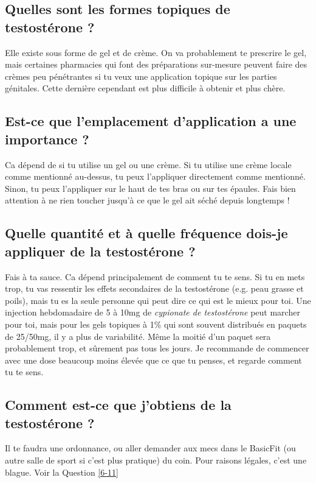 \documentclass{article}
\begin{document}
\subsection{Quelles sont les formes topiques de testostérone ?}

Elle existe sous forme de gel et de crème. On va probablement te prescrire le gel, mais certaines pharmacies qui font des préparations sur-mesure peuvent faire des crèmes peu pénétrantes si tu veux une application topique sur les parties génitales. Cette dernière cependant est plus difficile à obtenir et plus chère.

\subsection{Est-ce que l'emplacement d'application a une importance ?}

Ca dépend de si tu utilise un gel ou une crème. Si tu utilise une crème locale comme mentionné au-dessus, tu peux l'appliquer directement comme mentionné. Sinon, tu peux l'appliquer sur le haut de tes bras ou sur tes épaules. Fais bien attention à ne rien toucher jusqu'à ce que le gel ait séché depuis longtemps !

\subsection{Quelle quantité et à quelle fréquence dois-je appliquer de la testostérone ?}

Fais à ta sauce. Ca dépend principalement de comment tu te sens. Si tu en mets trop, tu vas ressentir les effets secondaires de la testostérone (e.g. peau grasse et poils), mais tu es la seule personne qui peut dire ce qui est le mieux pour toi. Une injection hebdomadaire de 5 à 10mg de \textit{cypionate de testostérone} peut marcher pour toi, mais pour les gels topiques à 1\% qui sont souvent distribués en paquets de 25/50mg, il y a plus de variabilité. Même la moitié d'un paquet sera probablement trop, et sûrement pas tous les jours. Je recommande de commencer avec une dose beaucoup moins élevée que ce que tu penses, et regarde comment tu te sens.

\subsection{Comment est-ce que j'obtiens de la testostérone ?}

Il te faudra une ordonnance, ou aller demander aux mecs dans le BasicFit (ou autre salle de sport si c'est plus pratique) du coin. Pour raisons légales, c'est une blague. Voir la Question \ref{6-11}
\end{document}
